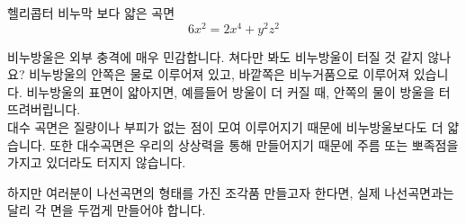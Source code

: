 ﻿\begin{surferPage}{헬리콥터}
비누막 보다 얇은 곡면\\
  \smallskip
\[6x^2	= 2x^4	+ y^2	z^2\]

\singlespacing
비누방울은 외부 충격에 매우 민감합니다. 쳐다만 봐도 비누방울이 터질 것 같지 않나요? 비누방울의 안쪽은 물로 이루어져 있고, 바깥쪽은 비누거품으로 이루어져 있습니다. 비누방울의 표면이 얇아지면, 예를들어  방울이 더 커질 때, 안쪽의 물이 방울을 터뜨려버립니다.\\
\vspace{0,3cm}
대수 곡면은 질량이나 부피가 없는 점이 모여 이루어지기 때문에 비누방울보다도 더 얇습니다. 또한 대수곡면은 우리의 상상력을 통해 만들어지기 때문에 주름 또는 뽀족점을 가지고 있더라도 터지지 않습니다.\\
\vspace{0,3cm}

하지만 여러분이 나선곡면의 형태를 가진 조각품 만들고자 한다면, 실제 나선곡면과는 달리 각 면을 두껍게 만들어야 합니다.
\end{surferPage}
